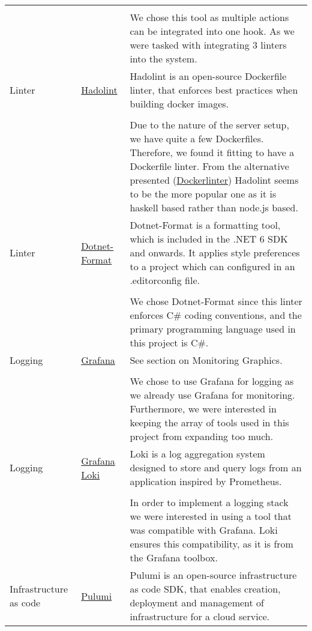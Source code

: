 \begin{longtable}{|p{}|p{} | p{}|}
    &&\\
    && We chose this tool as multiple actions can be integrated into one hook. As we were tasked with integrating 3 linters into the system.\\
    \hline
    Linter & \href{https://github.com/hadolint/hadolint}{Hadolint} & Hadolint is an open-source Dockerfile linter, that enforces best practices when building docker images.\\
    &&\\
    && Due to the nature of the server setup, we have quite a few Dockerfiles. Therefore, we found it fitting to have a Dockerfile linter. From the alternative presented (\href{https://github.com/RedCoolBeans/dockerlint}{Dockerlinter}) Hadolint seems to be the more popular one as it is haskell based rather than node.js based.\\
    \hline
    Linter & \href{https://learn.microsoft.com/en-us/dotnet/core/tools/dotnet-format}{Dotnet-Format} & Dotnet-Format is a formatting tool, which is included in the .NET 6 SDK and onwards. It applies style preferences to a project which can configured in an .editorconfig file.\\
    &&\\
    && We chose Dotnet-Format since this linter enforces C\# coding conventions, and the primary programming language used in this project is C\#.\\
    \hline
    Logging & \href{https://grafana.com/}{Grafana} & See section on Monitoring Graphics.\\
    &&\\
    && We chose to use Grafana for logging as we already use Grafana for monitoring. Furthermore, we were interested in keeping the array of tools used in this project from expanding too much.\\
    \hline
    Logging & \href{https://grafana.com/docs/loki/latest/}{Grafana Loki} & Loki is a log aggregation system designed to store and query logs from an application inspired by Prometheus.\\
    &&\\
    && In order to implement a logging stack we were interested in using a tool that was compatible with Grafana. Loki ensures this compatibility, as it is from the Grafana toolbox.\\
    \hline
    Infrastructure as code & \href{https://www.pulumi.com/docs/}{Pulumi} & Pulumi is an open-source infrastructure as code SDK, that enables creation, deployment and management of infrastructure for a cloud service.\\

\end{longtable}
